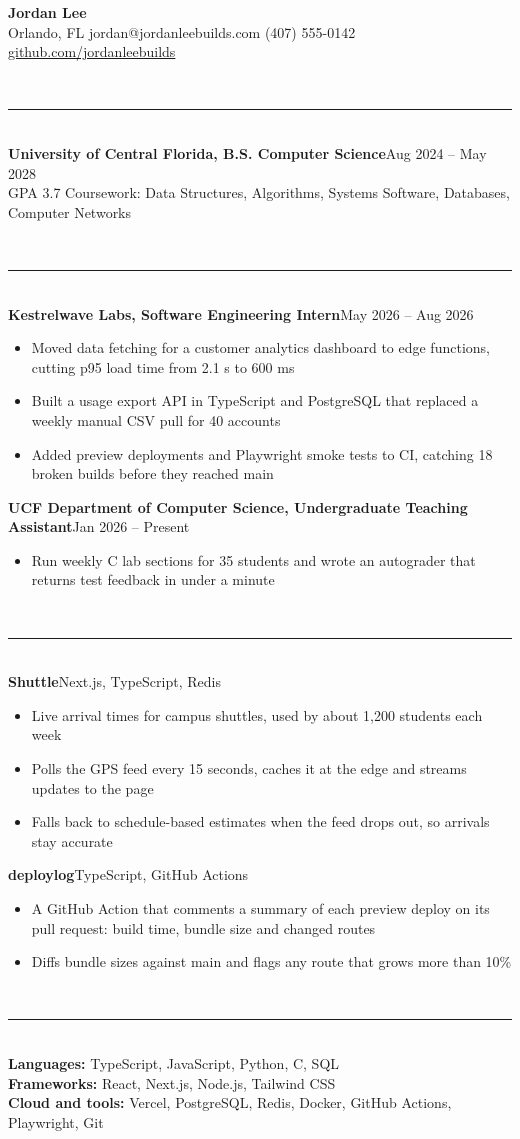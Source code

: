 \documentclass[10pt,letterpaper]{article}
\newcommand{\entry}[2]{\textbf{#1}\hfill #2\\[-6pt]}
\newcommand{\sect}[1]{\vspace{6pt}{\large\textbf{#1}}\\[-8pt]\rule{\linewidth}{0.4pt}\\[-4pt]}
\begin{document}
\begin{center}
{\LARGE\textbf{Jordan Lee}}\\
Orlando, FL \textbar{} jordan@jordanleebuilds.com \textbar{} (407) 555-0142 \textbar{}
\href{https://github.com/jordanleebuilds}{github.com/jordanleebuilds}
\end{center}

\sect{Education}
\entry{University of Central Florida, B.S. Computer Science}{Aug 2024 -- May 2028}
GPA 3.7 \textbar{} Coursework: Data Structures, Algorithms, Systems Software, Databases, Computer Networks

\sect{Experience}
\entry{Kestrelwave Labs, Software Engineering Intern}{May 2026 -- Aug 2026}
\begin{itemize}
  \item Moved data fetching for a customer analytics dashboard to edge functions, cutting p95 load time from 2.1 s to 600 ms
  \item Built a usage export API in TypeScript and PostgreSQL that replaced a weekly manual CSV pull for 40 accounts
  \item Added preview deployments and Playwright smoke tests to CI, catching 18 broken builds before they reached main
\end{itemize}
\entry{UCF Department of Computer Science, Undergraduate Teaching Assistant}{Jan 2026 -- Present}
\begin{itemize}
  \item Run weekly C lab sections for 35 students and wrote an autograder that returns test feedback in under a minute
\end{itemize}

\sect{Projects}
\entry{Shuttle}{Next.js, TypeScript, Redis}
\begin{itemize}
  \item Live arrival times for campus shuttles, used by about 1,200 students each week
  \item Polls the GPS feed every 15 seconds, caches it at the edge and streams updates to the page
  \item Falls back to schedule-based estimates when the feed drops out, so arrivals stay accurate
\end{itemize}
\entry{deploylog}{TypeScript, GitHub Actions}
\begin{itemize}
  \item A GitHub Action that comments a summary of each preview deploy on its pull request: build time, bundle size and changed routes
  \item Diffs bundle sizes against main and flags any route that grows more than 10\%
\end{itemize}

\sect{Skills}
\textbf{Languages:} TypeScript, JavaScript, Python, C, SQL\\
\textbf{Frameworks:} React, Next.js, Node.js, Tailwind CSS\\
\textbf{Cloud and tools:} Vercel, PostgreSQL, Redis, Docker, GitHub Actions, Playwright, Git
\end{document}
